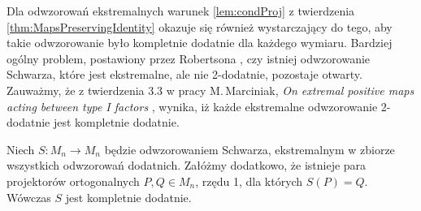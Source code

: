 Dla odwzorowań ekstremalnych warunek \ref{lem:condProj} z
twierdzenia \ref{thm:MapsPreservingIdentity} okazuje się również wystarczający
do tego, aby takie odwzorowanie było kompletnie dodatnie dla każdego wymiaru.
Bardziej ogólny problem, postawiony przez Robertsona
\cite{robertson1983schwarz},
czy istniej odwzorowanie Schwarza, które jest ekstremalne, ale
nie 2-dodatnie, pozostaje otwarty.
Zauważmy, że z twierdzenia 3.3 w pracy
M.\,Marciniak, \emph{On extremal positive maps acting between type I factors}
\cite{marciniak2008extremal}, wynika, iż
każde ekstremalne odwzorowanie 2-dodatnie jest kompletnie dodatnie.

\begin{Theorem}
\label{thm:ExtremalSchwarz}
Niech $S: M_{n} \rightarrow M_{n}$
będzie odwzorowaniem Schwarza, ekstremalnym w zbiorze wszystkich odwzorowań
dodatnich. Załóżmy dodatkowo, że
istnieje para projektorów ortogonalnych $P, Q \in M_{n}$, rzędu 1,
dla których $S(P) = Q$.
Wówczas $S$ jest kompletnie dodatnie.
\end{Theorem}
